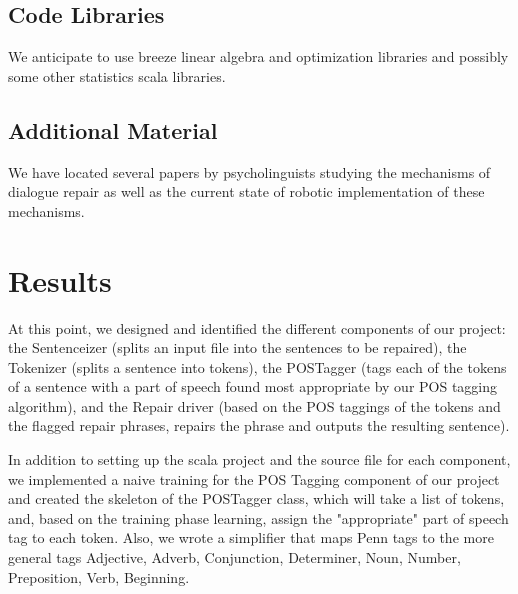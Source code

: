 \documentclass{article}
\begin{document}
\subsection{Code Libraries}

\begin{flushleft}
We anticipate to use breeze linear algebra and optimization libraries and possibly some other statistics scala libraries.
\end{flushleft}

\subsection{Additional Material}

We have located several papers by psycholinguists studying the mechanisms of dialogue repair as well as the current state of robotic implementation of these mechanisms.

\section{Results}

\begin {flushleft}

At this point, we designed and identified the different components of our project: the Sentenceizer (splits an input file into the sentences to be repaired), the Tokenizer (splits a sentence into tokens), the POSTagger (tags each of the tokens of a sentence with a part of speech found most appropriate by our POS tagging algorithm), and the Repair driver (based on the POS taggings of the tokens and the flagged repair phrases, repairs the phrase and outputs the resulting sentence).

\end {flushleft}

\begin {flushleft}

 In addition to setting up the scala project and the source file for each component, we implemented a naive training for the POS Tagging component of our project and created the skeleton of the POSTagger class, which will take a list of tokens, and, based on the training phase learning, assign the "appropriate" part of speech tag to each token. Also, we wrote a simplifier that maps Penn tags to the more general tags {Adjective, Adverb, Conjunction, Determiner, Noun, Number, Preposition, Verb, Beginning}.
 
 \end{flushleft}
\end{document}
